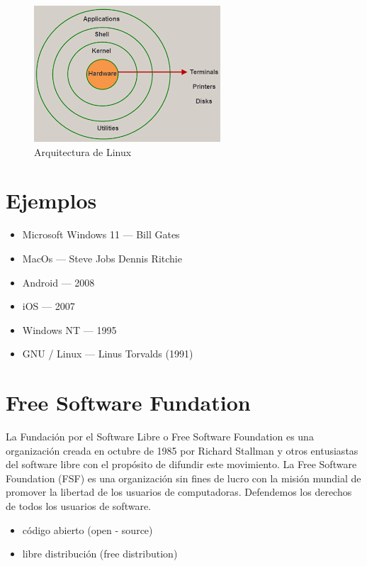 \documentclass[11pt,twoside]{book}
\begin{document}
\begin{figure}[htb]
  \centering
  \includegraphics[width=0.8\linewidth]{A.L.png}
  \caption{Arquitectura de Linux}
  \label{fig:etiqueta}
\end{figure}

\newpage
\section{Ejemplos}

\begin{itemize}
  \item Microsoft Windows 11 --- Bill Gates
  \item MacOs --- Steve Jobs Dennis Ritchie
  \item Android --- 2008
  \item iOS --- 2007
  \item Windows NT --- 1995
  \item GNU / Linux ---  Linus Torvalds (1991)
  \end{itemize}


\section{Free Software Fundation}
La Fundación por el Software Libre o Free Software Foundation es una organización creada en octubre de 1985 por Richard Stallman y otros entusiastas del software libre con el propósito de difundir este movimiento. La Free Software Foundation (FSF) es una organización sin fines de lucro con la misión mundial de promover la libertad de los usuarios de computadoras. Defendemos los derechos de todos los usuarios de software.

\begin{itemize}
  \item código abierto (open - source)
  \item libre distribución (free distribution)

\end{itemize}
\end{document}
